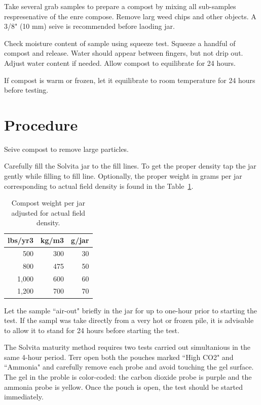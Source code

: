 \documentclass[12pt]{../SOP4_alpha}\usepackage[]{graphicx}\usepackage[]{xcolor}
\begin{document}
\NP Take several grab samples to prepare a compost by mixing all sub-samples respresenative of the enre compose. Remove larg weed chips and other objects. A 3/8" (10 mm) seive is recommended before laoding jar.

\NP Check moisture content of sample using squeeze test. Squeeze a handful of compost and release. Water should appear between fingers, but not drip out. Adjust water content if needed. Allow compost to equilibrate for 24 hours.

\NP If compost is warm or frozen, let it equilibrate to room temperature for 24 hours before testing.


\section{Procedure}

\NP Seive compost to remove large particles.

\NP Carefully fill the Solvita jar to the fill lines. To get the proper density tap the jar gently while filling to fill line. Optionally, the proper weight in grams per jar corresponding to actual field density is found in the Table~\ref{tab:jarweight}.

\begin{table}[ht]
\caption{Compost weight per jar adjusted for actual field density.}
\label{tab:jarweight}
\centering
\begin{tabular}{rrr}
  \hline
 \textbf{lbs/yr3} & \textbf{kg/m3} & \textbf{g/jar} \\ 
  \hline \hline
  500   & 300   & 30 \\
  800   & 475   & 50 \\
  1,000 & 600   & 60 \\
  1,200 & 700   & 70 \\ \hline
\end{tabular}
\end{table}


\NP Let the sample ``air-out" briefly in the jar for up to one-hour prior to starting the test. If the sampl was take directly from a very hot or frozen pile, it is advisable to allow it to stand for 24 hours before starting the test. 

\NP The Solvita maturity method requires two tests carried out simultanious in the same 4-hour period. Terr open both the pouches marked ``High CO2" and ``Ammonia" and carefully remove each probe and avoid touching the gel surface. The gel in the proble is color-coded: the carbon dioxide probe is purple and the ammonia probe is yellow. Once the pouch is open, the test should be started immediately. 
\end{document}
